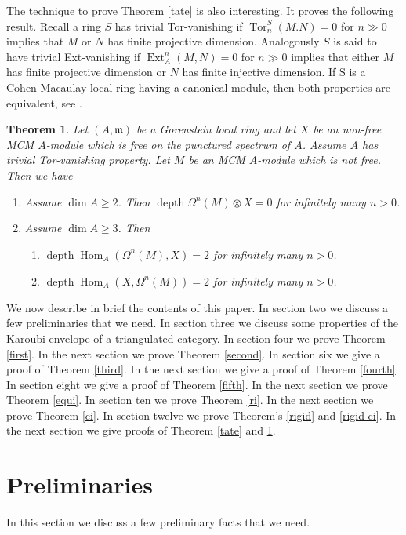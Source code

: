 \documentclass{amsart}
\newcommand{\m}{\mathfrak{m} }
\newcommand{\depth}{\operatorname{depth}}
\newcommand{\Hom}{\operatorname{Hom}}
\newcommand{\Ext}{\operatorname{Ext}}
\newcommand{\Tor}{\operatorname{Tor}}
\theoremstyle{plain}
\newtheorem{theorem}{Theorem}[section]
\theoremstyle{definition}
\theoremstyle{remark}
\begin{document}
{The technique  to prove Theorem  \ref{tate} is also interesting. It proves the following result. Recall a ring $S$ has trivial Tor-vanishing if $\Tor^S_n(M. N) = 0$ for $n \gg 0$ implies that $M$ or $N$ has finite projective dimension. Analogously $S$ is said to have trivial Ext-vanishing if $\Ext^n_A(M, N) = 0$ for $n \gg 0$ implies that either $M$ has finite projective dimension or $N$ has finite injective dimension. If S is a Cohen-Macaulay local ring
having a canonical module, then both properties are equivalent, see \cite[3.2]{LM}.

\begin{theorem}
\label{tate-trivial} Let $(A,\m)$ be a Gorenstein local ring and let $X$ be an non-free MCM $A$-module which is free on the punctured spectrum of $A$. Assume $A$ has trivial Tor-vanishing property.  Let $M$ be an MCM $A$-module which is not free. Then we have
\begin{enumerate}[\rm (1)]
\item
Assume $\dim A \geq 2$. Then $\depth \Omega^n(M)\otimes X = 0$ for infinitely many $n > 0$.
\item
Assume $\dim A \geq 3$. Then
\begin{enumerate}[\rm (a)]
\item
$\depth \Hom_A(\Omega^n(M),  X) = 2$ for infinitely many  $n > 0$.
\item
$\depth \Hom_A(X, \Omega^n(M)) = 2$ for infinitely many  $n > 0$.
\end{enumerate}
\end{enumerate}
\end{theorem}

We now describe in brief the contents of this paper. In section two we discuss a few preliminaries that we need. In section three we discuss some properties of the Karoubi envelope of a triangulated category. In section four we prove Theorem \ref{first}. In the next section we prove Theorem \ref{second}. In section six we give a proof of Theorem \ref{third}. In the next section we give a proof of Theorem \ref{fourth}. In section eight we give a proof of Theorem \ref{fifth}. In the next section we prove Theorem \ref{equi}. In section ten we prove Theorem \ref{ri}. In the next section we prove Theorem \ref{ci}. In section twelve we prove Theorem's \ref{rigid} and \ref{rigid-ci}. In the next section we give proofs of Theorem \ref{tate} and \ref{tate-trivial}.
\section{Preliminaries}
In this section we discuss a few preliminary facts that we need.

}
\end{document}
